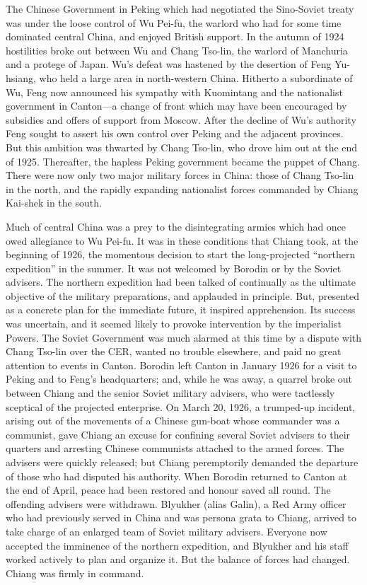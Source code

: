The Chinese Government in Peking which had negotiated the Sino-Soviet treaty was under the loose control of Wu Pei-fu, the warlord who had for some time dominated central China, and enjoyed British support. In the autumn of 1924 hostilities broke out between Wu and Chang Tso-lin, the warlord of Manchuria and a protege of Japan. Wu's defeat was hastened by the desertion of Feng Yu-hsiang, who held a large area in north-western China. Hitherto a subordinate of Wu, Feng now announced his sympathy with Kuomintang and the nationalist government in Canton---a change of front which may have been encouraged by subsidies and offers of support from Moscow. After the decline of Wu's authority Feng sought to assert his own control over Peking and the adjacent provinces. But this ambition was thwarted by Chang Tso-lin, who drove him out at the end of 1925. Thereafter, the hapless Peking government became the puppet of Chang. There were now only two major military forces in China: those of Chang Tso-lin in the north, and the rapidly expanding nationalist forces commanded by Chiang Kai-shek in the south. 

Much of central China was a prey to the disintegrating armies which had once owed allegiance to Wu Pei-fu. It was in these conditions that Chiang took, at the beginning of 1926, the momentous decision to start the long-projected ``northern expedition'' in the summer. It was not welcomed by Borodin or by the Soviet advisers. The northern expedition had been talked of continually as the ultimate objective of the military preparations, and applauded in principle. But, presented as a concrete plan for the immediate future, it inspired apprehension. Its success was uncertain, and it seemed likely to provoke intervention by the imperialist Powers. The Soviet Government was much alarmed at this time by a dispute with Chang Tso-lin over the CER, wanted no trouble elsewhere, and paid no great attention to events in Canton. Borodin left Canton in January 1926 for a visit to Peking and to Feng's headquarters; and, while he was away, a quarrel broke out between Chiang and the senior Soviet military advisers, who were tactlessly sceptical of the projected enterprise. On March 20, 1926, a trumped-up incident, arising out of the movements of a Chinese gun-boat whose commander was a communist, gave Chiang an excuse for confining several Soviet advisers to their quarters and arresting Chinese communists attached to the armed forces. The advisers were quickly released; but Chiang peremptorily demanded the departure of those who had disputed his authority. When Borodin returned to Canton at the end of April, peace had been restored and honour saved all round. The offending advisers were withdrawn. Blyukher (alias Galin), a Red Army officer who had previously served in China and was persona grata to Chiang, arrived to take charge of an enlarged team of Soviet military advisers. Everyone now accepted the imminence of the northern expedition, and Blyukher and his staff worked actively to plan and organize it. But the balance of forces had changed. Chiang was firmly in command. 

